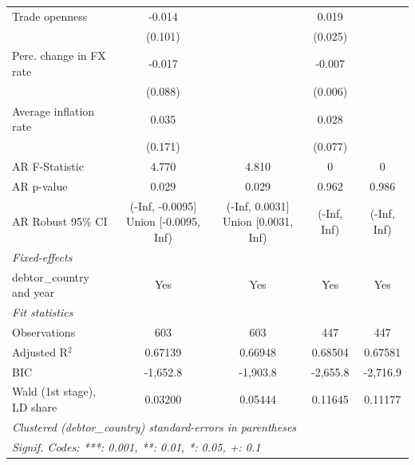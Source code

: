 \begin{table}[htbp]
\begin{tabular}{lcccc}
      Trade openness             & -0.014                               &                                    & 0.019       &   \\   
                                 & (0.101)                              &                                    & (0.025)     &   \\   
      Perc. change in FX rate    & -0.017                               &                                    & -0.007      &   \\   
                                 & (0.088)                              &                                    & (0.006)     &   \\   
      Average inflation rate     & 0.035                                &                                    & 0.028       &   \\   
                                 & (0.171)                              &                                    & (0.077)     &   \\   
      AR F-Statistic             & 4.770                                & 4.810                              & 0           & 0\\  
      AR p-value                 & 0.029                                & 0.029                              & 0.962       & 0.986\\  
      AR Robust 95\% CI          & (-Inf, -0.0095] Union [-0.0095, Inf) & (-Inf, 0.0031] Union [0.0031, Inf) & (-Inf, Inf) & (-Inf, Inf)\\  
      \midrule
      \emph{Fixed-effects}\\
      debtor\_country and year   & Yes                                  & Yes                                & Yes         & Yes\\  
      \midrule
      \emph{Fit statistics}\\
      Observations               & 603                                  & 603                                & 447         & 447\\  
      Adjusted R$^2$             & 0.67139                              & 0.66948                            & 0.68504     & 0.67581\\  
      BIC                        & -1,652.8                             & -1,903.8                           & -2,655.8    & -2,716.9\\  
      Wald (1st stage), LD share & 0.03200                              & 0.05444                            & 0.11645     & 0.11177\\  
      \midrule \midrule
      \multicolumn{5}{l}{\emph{Clustered (debtor\_country) standard-errors in parentheses}}\\
      \multicolumn{5}{l}{\emph{Signif. Codes: ***: 0.001, **: 0.01, *: 0.05, +: 0.1}}\\
   \end{tabular}
\end{table}


